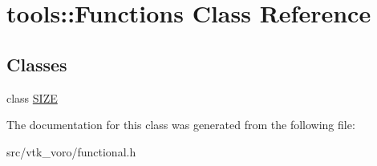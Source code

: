\hypertarget{classtools_1_1Functions}{}\section{tools\+:\+:Functions Class Reference}
\label{classtools_1_1Functions}
\subsection*{Classes}
\begin{DoxyCompactItemize}
\item 
class \hyperlink{classtools_1_1Functions_1_1SIZE}{S\+I\+ZE}
\end{DoxyCompactItemize}


The documentation for this class was generated from the following file\+:\begin{DoxyCompactItemize}
\item 
src/vtk\+\_\+voro/functional.\+h\end{DoxyCompactItemize}
